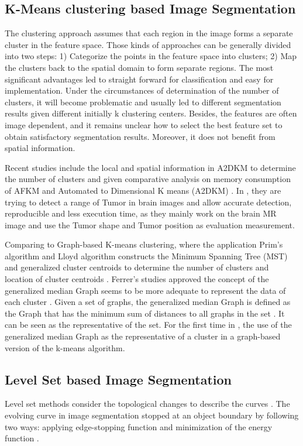 \subsection{ K-Means clustering based Image Segmentation }
The clustering approach assumes that each region in the image forms a separate cluster in the feature space. Those kinds of approaches can be generally divided into two steps: 1) Categorize the points in the feature space into clusters; 2) Map the clusters back to the spatial domain to form separate regions. The most significant advantages led to straight forward for classification and easy for implementation. Under the circumstances of determination of the number of clusters, it will become problematic and usually led to different segmentation results given different initially k clustering centers. Besides, the features are often image dependent, and it remains unclear how to select the best feature set to obtain satisfactory segmentation results. Moreover, it does not benefit from spatial information. 

Recent studies include the local and spatial information in A2DKM to determine the number of clusters and given comparative analysis on memory consumption of AFKM and Automated to Dimensional K means (A2DKM) \cite{A2D}. In \cite{advanced}, they are trying to detect a range of Tumor in brain images and allow accurate detection, reproducible and less execution time, as they mainly work on the brain MR image and use the Tumor shape and Tumor position as evaluation measurement. 

Comparing to Graph-based K-means clustering\cite{graph}, where the application Prim's algorithm and Lloyd algorithm constructs the Minimum Spanning Tree (MST) and generalized cluster centroids to determine the number of clusters and location of cluster centroids \cite{graphmeidan}. Ferrer's studies approved the concept of the generalized median Graph seems to be more adequate to represent the data of each cluster \cite{taneja}.  Given a set of graphs, the generalized median Graph is defined as the Graph that has the minimum sum of distances to all graphs in the set \cite{taneja}. It can be seen as the representative of the set.  For the first time in \cite{graphmeidan}, the use of the generalized median Graph as the representative of a cluster in a graph-based version of the k-means algorithm. 


\subsection{ Level Set based Image Segmentation }
Level set methods consider the topological changes to describe the curves \cite{li18}. The evolving curve in image segmentation stopped at an object boundary by following two ways: applying edge-stopping function and minimization of the energy function \cite{taneja}.


